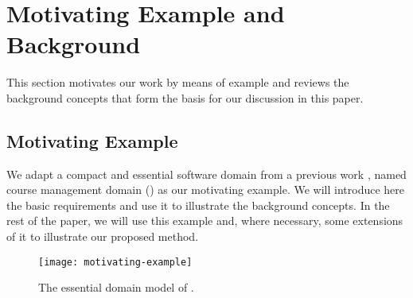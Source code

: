 \section{Motivating Example and Background} \label{sect:background}

This section motivates our work by means of example and reviews the background concepts that form the basis for our discussion in this paper.

\subsection{Motivating Example} 
\label{sect:bg-courseman-eg}

We adapt a compact and essential software domain from a previous work \cite{le_domain_2018}, named course management domain (\courseman) as our motivating example. We will introduce here the basic \courseman requirements and use it to illustrate the background concepts. In the rest of the paper, we will use this example and, where necessary, some extensions of it to illustrate our proposed method.

\begin{figure}[th]
\begin{center}
\texttt{[image: motivating-example]}
\end{center}
\caption{The essential domain model of \courseman.}
\label{fig:motivatingExample}
\end{figure}

